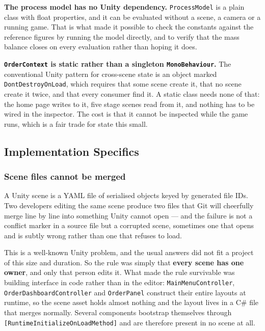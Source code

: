 \textbf{The process model has no Unity dependency.} \texttt{ProcessModel} is a plain class with float properties, and it can be evaluated without a scene, a camera or a running game. That is what made it possible to check the constants against the reference figures by running the model directly, and to verify that the mass balance closes on every evaluation rather than hoping it does.

\textbf{\texttt{OrderContext} is static rather than a singleton
\texttt{MonoBehaviour}.} The conventional Unity pattern for cross-scene state is an object marked \texttt{DontDestroyOnLoad}, which requires that some scene create it, that no scene create it twice, and that every consumer find it. A static class needs none of that: the home page writes to it, five stage scenes read from it, and nothing has to be wired in the inspector. The cost is that it cannot be inspected while the game runs, which is a fair trade for state this small.

\subsection{Implementation Specifics}

\subsubsection{Scene files cannot be merged}
\label{sec:scenemerge}

A Unity scene is a YAML file of serialised objects keyed by generated file IDs. Two developers editing the same scene produce two files that Git will cheerfully merge line by line into something Unity cannot open --- and the failure is not a conflict marker in a source file but a corrupted scene, sometimes one that opens and is subtly wrong rather than one that refuses to load.

This is a well-known Unity problem, and the usual answers did not fit a project of this size and duration. So the rule was simply that \textbf{every scene has one owner}, and only that person edits it. What made the rule survivable was building interface in code rather than in the editor: \texttt{MainMenuController}, \texttt{OrderDashboardController} and \texttt{OrderPanel} construct their entire layouts at runtime, so the scene asset holds almost nothing and the layout lives in a C\# file that merges normally. Several components bootstrap themselves through \texttt{[RuntimeInitializeOnLoadMethod]} and are therefore present in no
scene at all.

